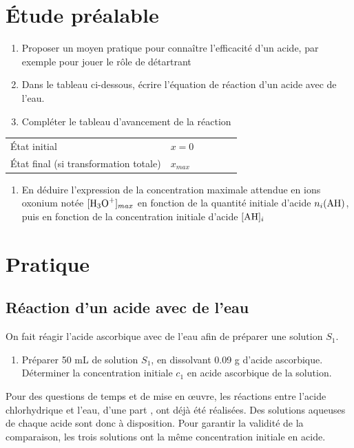 \documentclass[a4paper,11pt,fleqn]{article}%
\begin{document}
\section{Étude préalable}
\begin{enumerate}
	\item Proposer un moyen pratique pour connaître l'efficacité  d'un acide, par exemple pour jouer le rôle de détartrant
	\item Dans le tableau ci-dessous, écrire l'équation de réaction d'un acide  avec de l'eau.
	\item Compléter le tableau d'avancement de la réaction
\end{enumerate}

\begin{tabular}{|>{\centering}m{4cm}|>{\centering}m{2cm}|>{\centering}m{2cm}|>{\centering}m{2cm}||>{\centering}m{2cm}|>{\centering\arraybackslash}m{2cm}|}
\hline \multicolumn{2}{|c|}{} & \multicolumn{4}{c|}{\rule[1cm]{0cm}{0cm}}\\
\hline État initial & $x=0$ & & & & \rule[1cm]{0cm}{0cm}\\
\hline État final (si transformation totale) & $x_{max}$ & & & & \\
\hline
\end{tabular}
\begin{enumerate}[resume]
	\item En déduire l'expression de la concentration maximale attendue en ions oxonium notée $[\ce{H3O+}]_{max}$ en fonction de la quantité initiale d'acide $n_i(\ce{AH})$, puis en fonction de la concentration initiale d'acide $[\ce{AH}]_i$
\end{enumerate}

\section{Pratique}
	\subsection{Réaction d'un acide avec de l'eau}
	On fait réagir l'acide ascorbique avec de l'eau afin de préparer une solution $S_1$.
	\begin{enumerate}[resume]
		\item Préparer \num{50} \unit{\milli \liter} de solution $S_1$, en dissolvant \num{0,09} \unit{\gram} d'acide ascorbique. Déterminer la concentration initiale $c_1$ en acide ascorbique de la solution.
	\end{enumerate}
	Pour des questions de temps et de mise en œuvre, les réactions entre l'acide chlorhydrique et l'eau, d'une part , ont déjà été réalisées. Des solutions aqueuses de chaque acide sont donc à disposition. Pour garantir la validité de la comparaison, les trois solutions ont la même concentration initiale en acide.
\end{document}
